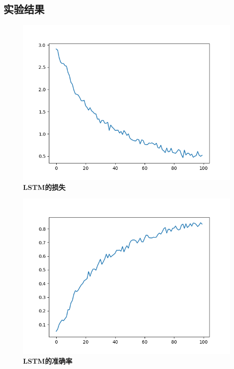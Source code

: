 \documentclass{article}
\begin{document}
\subsection{实验结果}
\begin{figure}[H]
   \centering
   \includegraphics[scale= 0.5]{LSTM_.png}
   \caption{\textbf{LSTM的损失}}
\end{figure}
\begin{figure}[H]
   \centering
   \includegraphics[scale= 0.5]{LSTM_validation_accuracy.png}
   \caption{\textbf{LSTM的准确率}}
\end{figure}
\end{document}
